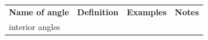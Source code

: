         \begin{center}
      
      \label{m39370*uid30}
      
    \noindent
      \tablelasttail{}
      \begin{xtabular*}{\mytablewidth}[t]{|p{3cm}|p{3cm}|p{3cm}|p{20\mystarwidth}|}\hline
    
    
        
                  \textbf{Name of angle}
                 &
    
    
        
                  \textbf{Definition}
                 &
    
    
        
                  \textbf{Examples}
                 &
    
    
        
                  \textbf{Notes}
     \tabularnewline{}
    
    
        interior angles &
    
    

\end{xtabular*}
\end{center}
